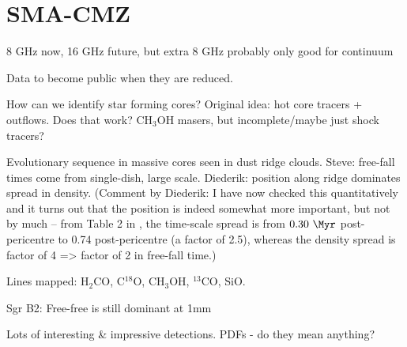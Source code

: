\section{SMA-CMZ}
8 GHz now, 16 GHz future, but extra 8 GHz probably only good for continuum

Data to become public when they are reduced.

How can we identify star forming cores?  Original idea: hot core tracers + outflows.  Does that work? CH$_3$OH masers, but incomplete/maybe just shock tracers?

Evolutionary sequence in massive cores seen in dust ridge clouds.  Steve: free-fall times come from single-dish, large scale.  Diederik: position along ridge dominates spread in density. (Comment by Diederik: I have now checked this quantitatively and it turns out that the position is indeed somewhat more important, but not by much -- from Table 2 in \citet{Kruijssen2015a}, the time-scale spread is from $0.30~\Myr$ post-pericentre to 0.74 post-pericentre (a factor of 2.5), whereas the density spread is factor of 4 => factor of 2 in free-fall time.)

Lines mapped: H$_2$CO, C$^{18}$O, CH$_3$OH, $^{13}$CO, SiO.

Sgr B2: Free-free is still dominant at 1mm

Lots of interesting & impressive detections.  PDFs - do they mean anything?